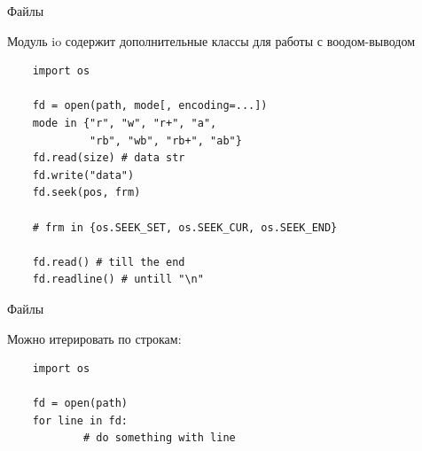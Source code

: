\documentclass{article}
\begin{document}
\begin{center} Файлы \end{center}
Модуль io содержит дополнительные классы для работы с воодом-выводом
\begin{lstlisting}
	import os

    fd = open(path, mode[, encoding=...])
    mode in {"r", "w", "r+", "a",
             "rb", "wb", "rb+", "ab"}
	fd.read(size) # data str
	fd.write("data")
	fd.seek(pos, frm)

	# frm in {os.SEEK_SET, os.SEEK_CUR, os.SEEK_END}

	fd.read() # till the end
	fd.readline() # untill "\n"
\end{lstlisting}
\newpage

\begin{center} Файлы \end{center}
Можно итерировать по строкам:
\begin{lstlisting}
	import os

    fd = open(path)
    for line in fd:
        	# do something with line
\end{lstlisting}
\newpage

\end{document}
